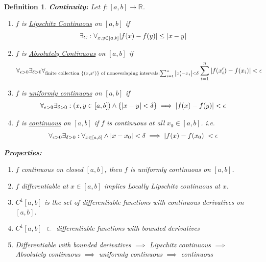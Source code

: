 \documentclass[]{article}
\newcommand{\R}{\mathbb{R}}
\newtheorem{definition}{Definition}
\begin{document}
\begin{definition}
    \textbf{Continuity:}
    Let $f : [a,b] \to \R$. 
    \begin{enumerate}
        \item $f$ is \emph{\underline{Lipschitz Continuous}} on $[a,b]$ if \[
            \exists_{C} : \forall_{x,y \in [a,b]} \abs{f(x) - f(y)} \leq \abs{x - y} 
        \]
        \item $f$ is \emph{\underline{Absolutely Continuous}} on $[a,b]$ if \[
            \forall_{\epsilon>0} \exists_{\delta>0}
            \forall_{
                \text{finite collection } \qty{(x,x')} \text{ of nonoverlaping intervals} 
                : \sum_{i=1}^{n} \abs{x_i' - x_i} < \delta
            } \sum_{i=1}^{n} \abs{f(x_i') - f(x_i)} < \epsilon
        \]
        \item $f$ is \underline{\emph{uniformly continuous}} on $[a,b]$ if \[
            \forall_{\epsilon>0} \exists_{\delta>0} : 
                \qty(x,y \in [a,b]) \land \qty{\abs{x-y} < \delta}
            \implies \abs{f(x) - f(y)} < \epsilon
        \]
        \item $f$ is \emph{\underline{continuous}} on $[a,b]$ if $f$ is continuous at all $x_0 \in [a,b]$.
        i.e. \[
            \forall_{\epsilon > 0} \exists_{\delta>0} : 
            \forall_{x \in [a,b]} \land \abs{x - x_0} < \delta
            \implies \abs{f(x) - f(x_0)} < \epsilon
        \]
    \end{enumerate}
    \emph{\underline{\textbf{Properties:}}}
    \begin{enumerate}
        \item $f$ continuous on closed $[a,b]$, then $f$ is uniformly continuous on $[a,b]$.
        \item $f$ differentiable at $x \in [a,b]$ implies Locally Lipschitz continuous at $x$.
        \item $C^1[a,b]$ is the set of differentiable functions with continuous derivatives on $[a,b]$.
        \item $C^1[a,b]$ $\subset$ differentiable functions with bounded derivatives
        \item Differentiable with bounded derivatives 
        $\implies$ Lipschitz continuous 
        $\implies$ Absolutely continuous
        $\implies$ uniformly continuous
        $\implies$ continuous
    \end{enumerate}
\end{definition}
\end{document}
